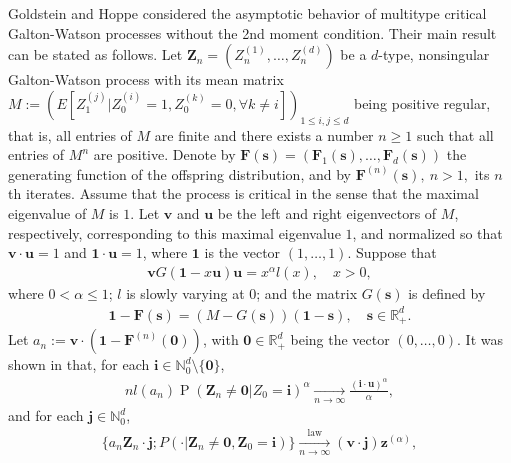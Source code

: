 \documentclass[12pt,a4paper]{amsart}
\theoremstyle{definition}
\numberwithin{equation}{section}
\begin{document}
Goldstein and Hoppe \cite{GoldsteinHoppe1978Critical} considered the asymptotic behavior of multitype critical Galton-Watson processes without the 2nd moment
condition. Their main result can be stated as follows.
  Let $\mathbf Z_n=(Z_n^{(1)}, \dots, Z_n^{(d)})$ be a $d$-type, nonsingular Galton-Watson process with its mean matrix $M:= (E[Z_1^{(j)}| Z_0^{(i)} = 1, Z_0^{(k)} = 0, \forall k \neq i])_{1\leq i,j\leq d}$ being positive regular, that is, all entries of $M$ are finite and there exists a number $n \geq 1$ such that all entries of $M^n$ are positive.
Denote by $\mathbf F(\mathbf s) = (\mathbf F_1(\mathbf s), \dots, \mathbf F_d(\mathbf s))$ the generating function of the offspring distribution, and by $\mathbf F^{(n)}(\mathbf s), ~ n>1,$ its $n$th iterates.
Assume that the process is critical in the sense that the maximal eigenvalue of $M$ is $1$.
Let $\mathbf v$ and $\mathbf u$ be the left and right  eigenvectors of $M$, respectively, corresponding to this maximal eigenvalue $1$, and normalized so that $\mathbf v \cdot \mathbf u = 1$ and $\mathbf 1 \cdot \mathbf u = 1$, where $\mathbf 1$ is the vector $(1,\dots, 1)$.
Suppose that
\begin{align}
  \label{eq: regularly varying condition for multitype branching process}
	\mathbf v G(\mathbf 1-x\mathbf u) \mathbf u
	= x^\alpha l(x),
	\quad x > 0,
\end{align}
where $0 < \alpha \leq 1$;
$l$ is slowly varying at $0$;
and the matrix $G(\mathbf s)$ is defined by
\begin{align}
	\mathbf 1 - \mathbf F(\mathbf s)
	= (M - G(\mathbf s))(\mathbf 1 - \mathbf s),
	\quad \mathbf s \in \mathbb R_+^d.
\end{align}
Let $a_n := \mathbf v \cdot (\mathbf 1 - \mathbf F^{(n)}(\mathbf 0))$, with $\mathbf 0 \in \mathbb R_+^d$ being the vector $(0,\dots, 0)$.
It was shown in \cite{GoldsteinHoppe1978Critical} that, for each $\mathbf i \in \mathbb N_0^d \setminus \{\mathbf 0\}$,
\begin{align}
  \label{eq: limit behavior of the exitinction probability without finite variance of multitype branching processes}
  n l(a_n)
	\operatorname{P}(\mathbf Z_n \neq \mathbf 0| Z_0 = \mathbf i)^\alpha
	\xrightarrow[n\to \infty]{}
	\frac{(\mathbf i \cdot \mathbf u)^\alpha}\alpha,
\end{align}
and for each $\mathbf j \in \mathbb N_0^d$,
\begin{align}\label{eq: conditioned normalized multitype branching process}
	\{ a_n \mathbf Z_n \cdot \mathbf j ; P(\cdot | \mathbf Z_n \neq \mathbf 0, \mathbf Z_0 = \mathbf i)\}
	\xrightarrow[n\to \infty]{\operatorname{law}} (\mathbf v\cdot \mathbf j) \mathbf z^{(\alpha)},
\end{align}
\end{document}
